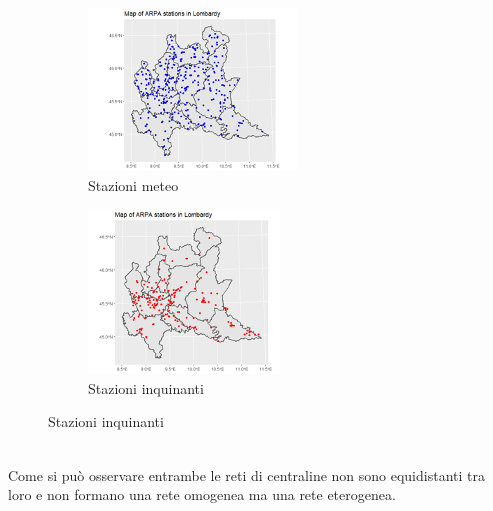\documentclass{article}
\begin{document}
\begin{figure}[h!]
    \centering
    \begin{subfigure}{.5\textwidth}
      \centering
      \includegraphics[width=.7\linewidth]{Picture/Lpollution.png}
      \caption{Stazioni meteo}
      \label{fig:sub1}
    \end{subfigure}%
    \begin{subfigure}{.5\textwidth}
      \centering
      \includegraphics[width=.7\linewidth]{Picture/Lweather.png}
      \caption{Stazioni inquinanti}
      \label{fig:sub2}
    \end{subfigure}
    \label{fig:test}
\end{figure}
\\Come si può osservare entrambe le reti di centraline non sono equidistanti tra loro e non formano 
una rete omogenea ma una rete eterogenea.
\end{document}
